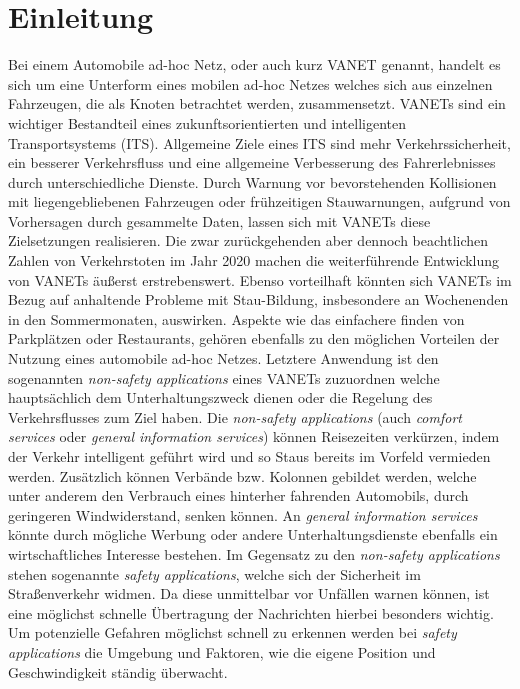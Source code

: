 \documentclass[english,runningheads,a4paper]{llncs}[2018/03/10]
\begin{document}
\section{Einleitung}\label{sec:intro}
Bei einem Automobile ad-hoc Netz, oder auch kurz VANET genannt, handelt es sich um eine Unterform eines mobilen ad-hoc Netzes welches sich aus einzelnen Fahrzeugen, die als Knoten betrachtet werden, zusammensetzt.
VANETs sind ein wichtiger Bestandteil eines zukunftsorientierten und intelligenten Transportsystems (ITS).
Allgemeine Ziele eines ITS sind mehr Verkehrssicherheit, ein besserer Verkehrsfluss und eine allgemeine Verbesserung des Fahrerlebnisses durch unterschiedliche Dienste.
Durch Warnung vor bevorstehenden Kollisionen mit liegengebliebenen Fahrzeugen oder frühzeitigen Stauwarnungen, aufgrund von Vorhersagen durch gesammelte Daten, lassen sich mit VANETs diese Zielsetzungen realisieren.
Die zwar zurückgehenden aber dennoch beachtlichen Zahlen von Verkehrstoten im Jahr 2020\cite{adacVerkehrstote} machen die weiterführende Entwicklung von VANETs äußerst erstrebenswert.
Ebenso vorteilhaft könnten sich VANETs im Bezug auf anhaltende Probleme mit Stau-Bildung, insbesondere an Wochenenden in den Sommermonaten\cite{adacStaus}, auswirken.
Aspekte wie das einfachere finden von Parkplätzen oder Restaurants, gehören ebenfalls zu den möglichen Vorteilen der Nutzung eines automobile ad-hoc Netzes.
Letztere Anwendung ist den sogenannten \textit{non-safety applications} eines VANETs zuzuordnen welche hauptsächlich dem Unterhaltungszweck dienen oder die Regelung des Verkehrsflusses zum Ziel haben.
Die \textit{non-safety applications} (auch \textit{comfort services} oder \textit{general information services}) können Reisezeiten verkürzen, indem der Verkehr intelligent geführt wird und so Staus bereits im Vorfeld vermieden werden.
Zusätzlich können Verbände bzw. Kolonnen gebildet werden, welche unter anderem den Verbrauch eines hinterher fahrenden Automobils, durch geringeren Windwiderstand, senken können.
An \textit{general information services} könnte durch mögliche Werbung oder andere Unterhaltungsdienste ebenfalls ein wirtschaftliches Interesse bestehen.
Im Gegensatz zu den \textit{non-safety applications} stehen sogenannte \textit{safety applications}, welche sich der Sicherheit im Straßenverkehr widmen.
Da diese unmittelbar vor Unfällen warnen können, ist eine möglichst schnelle Übertragung der Nachrichten hierbei besonders wichtig.
Um potenzielle Gefahren möglichst schnell zu erkennen werden bei \textit{safety applications} die Umgebung und Faktoren, wie die eigene Position und Geschwindigkeit ständig überwacht.
\end{document}
